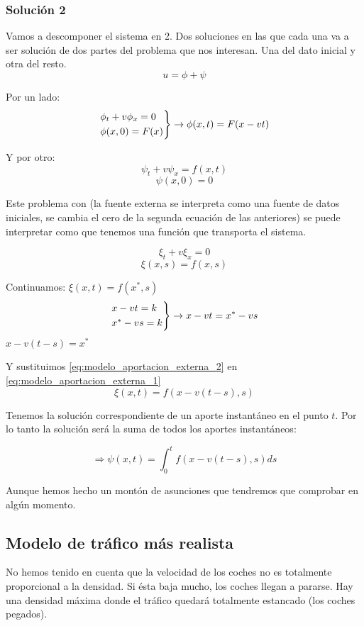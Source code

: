 \documentclass[palatino]{apuntes}
\begin{document}
\subsubsection{Solución 2}

Vamos a descomponer el sistema en 2. Dos soluciones en las que cada una va a ser solución de dos partes del problema que nos interesan. Una del dato inicial y otra del resto.
$$u = \phi + \psi$$

Por un lado:
$$
\begin{rcases}
	\phi_t + v\phi_x = 0 \\
	\phi(x,0) = F(x)
\end{rcases}
\rightarrow \phi(x,t) = F(x-vt)
$$

Y por otro:
$$\psi_t + v\psi_x = f(x,t)$$
$$\psi(x,0) = 0$$

Este problema con  (la fuente externa se interpreta como una fuente de datos iniciales, se cambia el cero de la segunda ecuación de las anteriores) se puede interpretar como que tenemos una función que transporta el sistema.

$$\xi_t + v\xi_x = 0$$
$$\xi(x,s) = f(x,s)$$

Continuamos:
\(\xi(x,t) = f(x^*,s) \label{eq:modelo_aportacion_externa_1}\)
$$
\begin{rcases}
	x-vt = k \\
	x^* - vs = k
\end{rcases}
 \rightarrow x-vt = x^* - vs
$$
\( x-v(t-s) = x^{*} \label{eq:modelo_aportacion_externa_2} \)

Y sustituimos \ref{eq:modelo_aportacion_externa_2} en \ref{eq:modelo_aportacion_externa_1}
$$\xi(x,t) = f(x - v(t-s), s)$$


Tenemos la solución correspondiente de un aporte instantáneo en el punto $t$. Por lo tanto la solución será la suma de todos los aportes instantáneos:

$$\Rightarrow \psi(x,t) = \int^{t}_{0} f(x-v(t-s),s) ds $$

Aunque hemos hecho un montón de asunciones que tendremos que comprobar en algún momento.

\subsection{Modelo de tráfico más realista}

No hemos tenido en cuenta que la velocidad de los coches no es totalmente proporcional a la densidad. Si ésta baja mucho, los coches llegan a pararse. Hay una densidad máxima donde el tráfico quedará totalmente estancado (los coches pegados).
\end{document}
